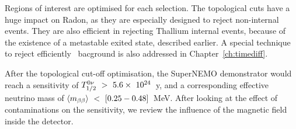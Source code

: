 Regions of interest are optimised for each selection.
The topological cuts have a huge impact on Radon, as they are especially designed to reject non-internal events.
They are also efficient in rejecting Thallium internal events, because of the existence of a metastable exited state, described earlier.
A special technique to reject efficiently \Tl\ bacground is also addressed in Chapter~\ref{ch:timediff}.

After the topological cut-off optimisation, the SuperNEMO demonstrator would reach a sensitivity of $T_{1/2}^{0\nu}~>~5.6\times~10^{24}$~y, and a corresponding effective neutrino mass of $\langle m_{\beta\beta}\rangle~<~[0.25-0.48]$~MeV.
After looking at the effect of contaminations on the sensitivity, we review the influence of the magnetic field inside the detector.

